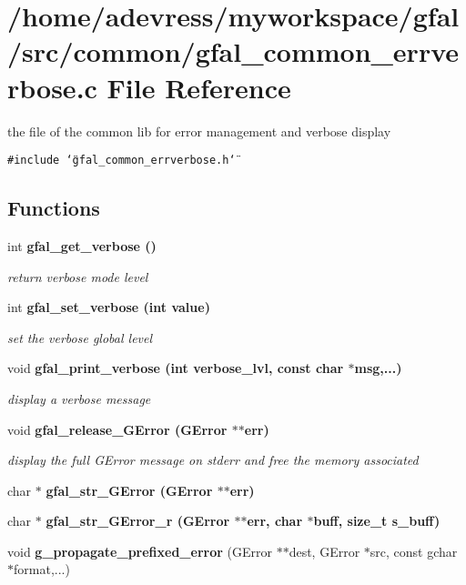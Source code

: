 \section{/home/adevress/myworkspace/gfal/src/common/gfal\_\-common\_\-errverbose.c File Reference}
\label{gfal__common__errverbose_8c}
the file of the common lib for error management and verbose display 

{\tt \#include \char`\"{}gfal\_\-common\_\-errverbose.h\char`\"{}}\par
\subsection*{Functions}
\begin{CompactItemize}
\item 
int \bf{gfal\_\-get\_\-verbose} ()\label{gfal__common__errverbose_8c_135b3fdd775aa7215e2ab4de1eea495f}

\begin{CompactList}\small\item\em return verbose mode level \item\end{CompactList}\item 
int \bf{gfal\_\-set\_\-verbose} (int value)
\begin{CompactList}\small\item\em set the verbose global level \item\end{CompactList}\item 
void \bf{gfal\_\-print\_\-verbose} (int verbose\_\-lvl, const char $\ast$msg,...)
\begin{CompactList}\small\item\em display a verbose message \item\end{CompactList}\item 
void \bf{gfal\_\-release\_\-GError} (GError $\ast$$\ast$err)\label{gfal__common__errverbose_8c_1441ea4b8176eb0cf3099009b950a3e9}

\begin{CompactList}\small\item\em display the full GError message on stderr and free the memory associated \item\end{CompactList}\item 
char $\ast$ \bf{gfal\_\-str\_\-GError} (GError $\ast$$\ast$err)
\item 
char $\ast$ \bf{gfal\_\-str\_\-GError\_\-r} (GError $\ast$$\ast$err, char $\ast$buff, size\_\-t s\_\-buff)
\item 
void \textbf{g\_\-propagate\_\-prefixed\_\-error} (GError $\ast$$\ast$dest, GError $\ast$src, const gchar $\ast$format,...)\label{gfal__common__errverbose_8c_ba441719ee1fd49a708add03c0eea22f}


\end{CompactItemize}
